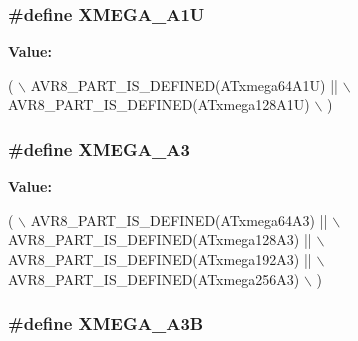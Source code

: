 \hypertarget{group__xmega__part__macros__group_ga6672329ddee03af905aa378946568b67}{
\subsubsection[{X\-M\-E\-G\-A\-\_\-\-A1\-U}]{\setlength{\rightskip}{0pt plus 5cm}\#define X\-M\-E\-G\-A\-\_\-\-A1\-U}}\label{group__xmega__part__macros__group_ga6672329ddee03af905aa378946568b67}
{\bfseries Value\-:}
\begin{DoxyCode}
( \(\backslash\)
                AVR8\_PART\_IS\_DEFINED(ATxmega64A1U)  || \(\backslash\)
                AVR8\_PART\_IS\_DEFINED(ATxmega128A1U) \(\backslash\)
                )
\end{DoxyCode}
\hypertarget{group__xmega__part__macros__group_ga831948bd467aa2355eb76ec708d2921a}{
\subsubsection[{X\-M\-E\-G\-A\-\_\-\-A3}]{\setlength{\rightskip}{0pt plus 5cm}\#define X\-M\-E\-G\-A\-\_\-\-A3}}\label{group__xmega__part__macros__group_ga831948bd467aa2355eb76ec708d2921a}
{\bfseries Value\-:}
\begin{DoxyCode}
( \(\backslash\)
                AVR8\_PART\_IS\_DEFINED(ATxmega64A3)  || \(\backslash\)
                AVR8\_PART\_IS\_DEFINED(ATxmega128A3) || \(\backslash\)
                AVR8\_PART\_IS\_DEFINED(ATxmega192A3) || \(\backslash\)
                AVR8\_PART\_IS\_DEFINED(ATxmega256A3) \(\backslash\)
                )
\end{DoxyCode}
\hypertarget{group__xmega__part__macros__group_ga32fef354d7f092b04ec41a0733e2c7ae}{
\subsubsection[{X\-M\-E\-G\-A\-\_\-\-A3\-B}]{\setlength{\rightskip}{0pt plus 5cm}\#define X\-M\-E\-G\-A\-\_\-\-A3\-B}}\label{group__xmega__part__macros__group_ga32fef354d7f092b04ec41a0733e2c7ae}
